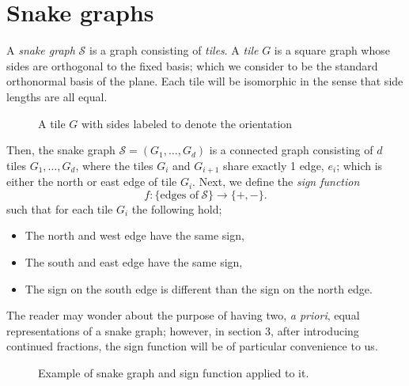 \section{Snake graphs}
A \emph{snake graph} $\mathcal{S}$ is a graph consisting of \emph{tiles}. A \emph{tile} $G$ is a square graph whose sides are orthogonal to the fixed basis; which we consider to be the standard orthonormal basis of the plane. Each tile will be isomorphic in the sense that side lengths are all equal. 

\begin{figure}[H]\label{tile}
    \centering
{}    
\caption{A tile $G$ with sides labeled to denote the orientation}
\end{figure}

Then, the snake graph $\mathcal{S} = (G_1,\dots,G_d)$ is a connected graph consisting of $d$ tiles $G_1,\dots,G_d$, where the tiles $G_i$ and $G_{i+1}$ share exactly 1 edge, $e_i$; which is either the north or east edge of tile $G_i$.
Next, we define the \emph{sign function}
\begin{equation*}
    f: \{\text{edges of} \  \mathcal{S}\} \to \{+,-\}.
\end{equation*}
such that for each tile $G_i$ the following hold;
\begin{itemize}
    \item The north and west edge have the same sign,
    \item The south and east edge have the same sign,
    \item The sign on the south edge is different than the sign on the north edge.
\end{itemize}
The reader may wonder about the purpose of having two, \emph{a priori}, equal representations of a snake graph; however, in section 3, after introducing continued fractions, the sign function will be of particular convenience to us.
\begin{figure}[H]
    \centering
    
    \caption{Example of snake graph and sign function applied to it.}
\end{figure}

